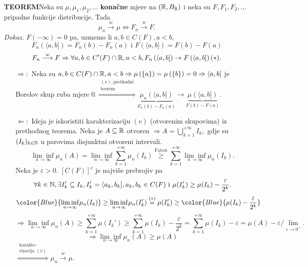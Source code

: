 \documentclass{article}
\newcommand{\myliminf}{\underset{n\to\infty}{\lim\inf}}
\begin{document}
\textbf{TEOREM}\newline Neka su \(\mu,\mu_1,\mu_2,\ldots\) \textbf{konačne} mjere na \(\left(\Bbb R,B_{\Bbb R}\right)\) i neka su \(F,F_1,F_2,\ldots\) pripadne funkcije distribucije. Tada \[\mu_n\overset{w}{\longrightarrow}\mu\Leftrightarrow F_n\overset{w}{\longrightarrow}F.\]
\textit{Dokaz.}\newline
\(F(-\infty)=0\) pa, uzmemo li \(a,b\in C(F),a<b,\) \[F_n\left(\langle a,b]\right)=F_n(b)-F_n(a)\text{ i }F\left(\langle a,b]\right)=F(b)-F(a)\] \[F_n\overset{w}{\longrightarrow}F\Rightarrow\forall a,b\in C'(F)\cap\Bbb R,a<b, F_n\left(\langle a,b]\right)\to F\left(\langle a,b]\right)(*).\] 
\begin{itemize}
    \item[\(\boxed{\Rightarrow}:\)] Neka su \(a,b\in C(F)\cap\Bbb R,a<b\Rightarrow\mu\left(\{a\}\right)=\mu\left(\{b\}\right)=0\Rightarrow\langle a,b]\) je Borelov skup ruba mjere \(0.\)\newline \(\overset{\substack{(v),\text{prethodni}\\\text{teorem}}}{\Rightarrow}\underbrace{\mu_n\left(\langle a,b]\right)}_{F_n(b)-F_n(a)}\to\underbrace{\mu\left(\langle a,b]\right)}_{F(b)-F(a)}.\)   \item[\(\boxed{\Leftarrow}:\)] Ideja je iskoristiti karakterizaciju \((v)\) (otvorenim skupovima) iz prethodnog teorema. Neka je \(A\subseteq\Bbb R\) otvoren \(\Rightarrow A=\bigcup_{k=1}^{+\infty}I_k,\) gdje su \((I_k)_{k\in\Bbb N}\) u parovima disjunktni otvoreni intervali. \[\underset{n\to\infty}{\lim\inf }\mu_n(A)=\underset{n\to\infty}{\lim\inf }\sum_{k=1}^{+\infty}\mu_n(I_k)\overset{\text{Fatou}}{\ge }\sum_{k=1}^{+\infty}\underset{n\to\infty}{\lim\inf }\mu_n(I_k).\] Neka je \(\varepsilon>0.\) \([C(F)]^c\) je najviše prebrojiv pa \[\forall k\in\Bbb N,\exists I_k'\subseteq I_k,I_k'=\langle a_k,b_k],a_k,b_k\in C(F)\text{ i }\mu(I_k')\ge\mu(I_k)-\frac\varepsilon{2^k}.\]  \[{\color{Blue}{\myliminf\mu_n(I_k)}}\ge\myliminf\mu_n(I_k')\overset{(*)}{=}\mu(I_k')\ge{\color{Blue}{\mu(I_k)-\frac\varepsilon{2^k}}}\]   \[\Rightarrow\underset{n\to\infty}{\lim\inf }\mu_n(A)\ge\sum_{k=1}^{+\infty}\mu(I_k')\ge\sum_{k=1}^{+\infty}\mu(I_k)-\frac\varepsilon{2^k}=\sum_{k=1}^{+\infty}\mu(I_k)-\varepsilon=\mu(A)-\varepsilon\bigg/\lim_{\varepsilon\to 0^+}.\] \[\Rightarrow\underset{n\to\infty}{\lim\inf }\mu_n(A)\ge\mu(A)\] \(\overset{\substack{\text{karakte-}\\\text{rizacija }(v)}}{\Rightarrow}\mu_n\overset{w}{\longrightarrow}\mu.\) 
\end{itemize}
\newpage
\end{document}
